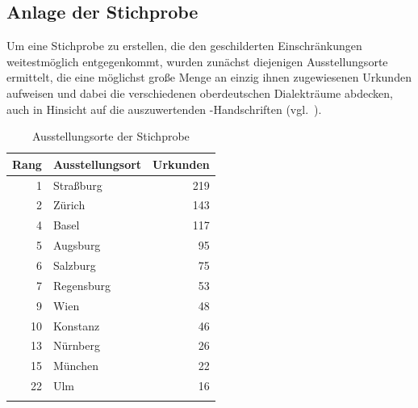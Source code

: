 \subsection{Anlage der Stichprobe}
\label{subsec:cao_sample}

Um eine Stichprobe zu erstellen, die den geschilderten Einschränkungen
weitestmöglich entgegenkommt, wurden zunächst diejenigen Ausstellungs\-orte
ermittelt, die eine möglichst große Menge an einzig ihnen zugewiesenen Urkunden
aufweisen und dabei die verschiedenen oberdeutschen
Dialekt\-räume abdecken, auch in Hinsicht auf die auszuwertenden
\KC{}-Handschriften (vgl.~).

\begin{table}
\centering
\caption{Ausstellungsorte der Stichprobe}
\begin{tabular}{r l r}
\lsptoprule
Rang
	& Ausstellungs\-ort
	& Urkunden
	\\

\midrule

 1 & Straßburg  & 219 \\
 2 & Zürich     & 143 \\
 4 & Basel      & 117 \\
 5 & Augsburg   &  95 \\
 6 & Salzburg   &  75 \\
 7 & Regensburg &  53 \\
 9 & Wien       &  48 \\
10 & Konstanz	&  46 \\
13 & Nürnberg   &  26 \\
15 & München    &  22 \\
22 & Ulm        &  16 \\

\lspbottomrule
\end{tabular}
\label{tab:adjstpr_orte}
\end{table}

